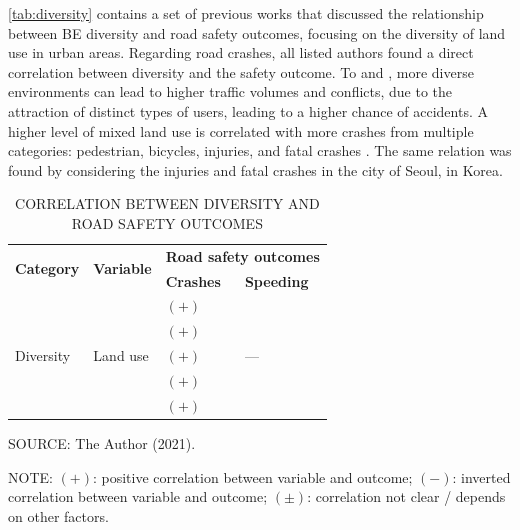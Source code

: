 \autoref{tab:diversity} contains a set of previous works that discussed the relationship between BE diversity and road safety outcomes, focusing on the diversity of land use in urban areas. Regarding road crashes, all listed authors found a direct correlation between diversity and the safety outcome. To \textcite{Obelheiro2020} and \textcite{Obelheiro2019}, more diverse environments can lead to higher traffic volumes and conflicts, due to the attraction of distinct types of users, leading to a higher chance of accidents. A higher level of mixed land use is correlated with more crashes from multiple categories: pedestrian, bicycles, injuries, and fatal crashes \cite{Ouyang2014}. The same relation was found by \textcite{Rhee2016} considering the injuries and fatal crashes in the city of Seoul, in Korea.

\begin{table}[!hbtp]
    \footnotesize
    \captionsetup{justification=raggedright,
        singlelinecheck=false,
        font=footnotesize}
    \caption{CORRELATION BETWEEN DIVERSITY AND ROAD SAFETY OUTCOMES}
    \centering
    \begin{tabular}{llll}
        \hline
        \multirow{2}{*}{\textbf{Category}} & \multirow{2}{*}{\textbf{Variable}} & \multicolumn{2}{c}{\textbf{Road safety outcomes}} \\
         &  & \textbf{Crashes} & \textbf{Speeding} \\ \hline
        \multirow{5}{*}{Diversity} & \multirow{5}{*}{Land use} & $(+)$ \textcite{Amoh-Gyimah2017} & \multirow{5}{*}{---} \\
         &  & $(+)$ \textcite{Obelheiro2019} &  \\
         &  & $(+)$ \textcite{Obelheiro2020} &  \\
         &  & $(+)$ \textcite{Ouyang2014} &  \\
         &  & $(+)$ \textcite{Rhee2016} &  \\ \hline
    \end{tabular}
    \label{tab:diversity}
    \par \vspace{2mm} \footnotesize \raggedright
    SOURCE: The Author (2021).
    \par \vspace{1mm} \footnotesize \raggedright
    NOTE: $(+)$: positive correlation between variable and outcome; $(-)$: inverted correlation between variable and outcome; $(\pm)$: correlation not clear / depends on other factors.
\end{table}

